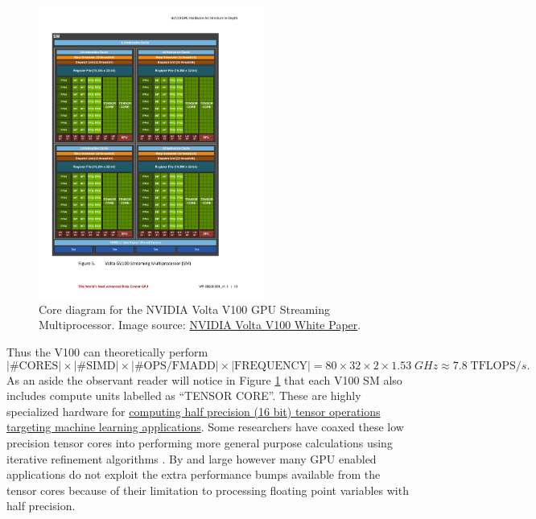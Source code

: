 \begin{figure}[htbp!]
    \centering
    \includegraphics[width=0.66\textwidth]{figures/L24/NVIDIAVoltaV100GPUCoreDiagram.pdf}
    \caption{Core diagram for the NVIDIA Volta V100 GPU Streaming Multiprocessor. Image source: \href{https://images.nvidia.com/content/volta-architecture/pdf/volta-architecture-whitepaper.pdf}{NVIDIA Volta V100 White Paper}.}
    \label{NVIDIAV100CoreDiagram.fig}
\end{figure}
Thus the V100 can theoretically perform
\[
|\mbox{\# CORES}| \times |\mbox{\# SIMD}| \times |\mbox{\# OPS/FMADD}| \times |\mbox{FREQUENCY}| = 80 \times 32 \times 2 \times 1.53\;GHz \approx 7.8\; \mbox{TFLOPS}/s.
\]
As an aside the observant reader will notice in Figure \ref{NVIDIAV100CoreDiagram.fig} that each V100 SM also includes compute units labelled as ``TENSOR CORE''. These are highly specialized hardware for \href{https://www.nvidia.com/en-us/data-center/tensorcore/}{computing half precision (16 bit) tensor operations targeting machine learning applications}. Some researchers have coaxed these low precision tensor cores into performing more general purpose calculations using iterative refinement algorithms \cite{masliah2016high,markidis2018nvidia,haidar2018harnessing,haidar2018design,blanchard2019mixed}. By and large however many GPU enabled applications do not exploit the extra performance bumps available from the tensor cores because of their limitation to processing floating point variables with half precision.

